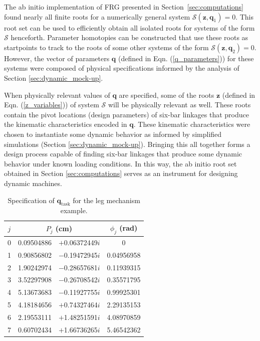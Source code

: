 \documentclass[journal]{IEEEtran}
\begin{document}
The ab initio implementation of FRG presented in Section~\ref{sec:computations} found nearly all finite roots for a numerically general system $\mathcal{S}(\mathbf{z},\mathbf{q}_1)=0$.
This root set can be used to efficiently obtain all isolated roots for systems of the form $\mathcal{S}$ henceforth.
Parameter homotopies can be constructed that use these roots as startpoints to track to the roots of some other systems of the form $\mathcal{S}(\mathbf{z},\mathbf{q}_2)=0$.
However, the vector of parameters $\mathbf{q}$ (defined in Eqn. (\ref{q_parameters})) for these systems were composed of physical specifications informed by the analysis of Section \ref{sec:dynamic_mock-up}.

When physically relevant values of $\mathbf{q}$ are specified, some of the roots $\mathbf{z}$ (defined in Eqn. (\ref{z_variables})) of system $\mathcal{S}$ will be physically relevant as well.
These roots contain the pivot locations (design parameters) of six-bar linkages that produce the kinematic characteristics encoded in $\mathbf{q}$.
These kinematic characteristics were chosen to instantiate some dynamic behavior as informed by simplified simulations (Section \ref{sec:dynamic_mock-up}).
Bringing this all together forms a design process capable of finding six-bar linkages that produce some dynamic behavior under known loading conditions.
In this way, the ab initio root set obtained in Section \ref{sec:computations} serves as an instrument for designing dynamic machines.


\begin{table}[t]
\caption{Specification of $\mathbf{q}_\text{task}$ for the leg mechanism example.}
\label{task_parameters}
\centering
\begin{tabular}{c|r@{}lc}
$j$ & \multicolumn{2}{c}{$P_j$ (cm)} & \multicolumn{1}{c}{$\phi_j$ (rad)} \\
\hline
0 & 0.09504886 & $+$0.06372449$i$ & 0 \\
1 & 0.90856802 & $-$0.19472945$i$ & 0.04956958 \\
2 & 1.90242974 & $-$0.28657681$i$ & 0.11939315 \\
3 & 3.52297908 & $-$0.26708542$i$ & 0.35571795 \\
4 & 5.13673683 & $-$0.11927755$i$ & 0.99925301 \\
5 & 4.18184656 & $+$0.74327464$i$ & 2.29135153 \\
6 & 2.19553111 & $+$1.48251591$i$ & 4.08970859 \\
7 & 0.60702434 & $+$1.66736265$i$ & 5.46542362 \\
\end{tabular}
\end{table}
\end{document}
